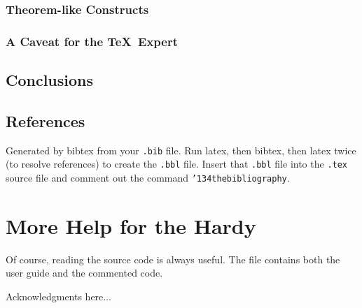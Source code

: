 \subsubsection{Theorem-like Constructs}
\subsubsection*{A Caveat for the \TeX\ Expert}
\subsection{Conclusions}
\subsection{References}
Generated by bibtex from your \texttt{.bib} file.  Run latex,
then bibtex, then latex twice (to resolve references)
to create the \texttt{.bbl} file.  Insert that \texttt{.bbl}
file into the \texttt{.tex} source file and comment out
the command \texttt{{\char'134}thebibliography}.
\section{More Help for the Hardy}

Of course, reading the source code is always useful.  The file
 contains both the user guide and the commented
code.

\begin{acks}
  Acknowledgments here...

\end{acks}
